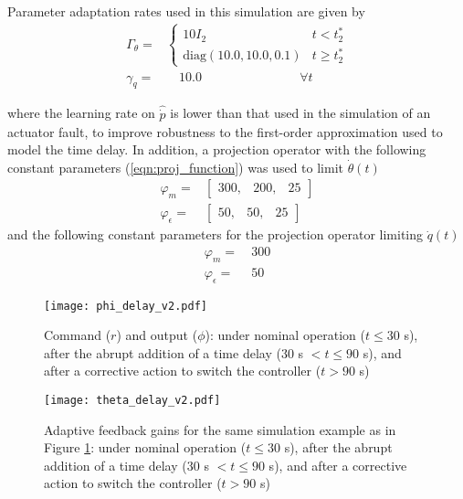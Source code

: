 \noindent Parameter adaptation rates used in this simulation are given by
\begin{align}
	\Gamma_\theta  = & \begin{cases}
		10 I_2 & t < t_2^*\\
		\text{diag}(10.0, 10.0, 0.1) & t \geq t_2^*
 	\end{cases} \\
	\gamma_q  = &\quad 10.0 \qquad ~ \qquad ~ \qquad ~ \quad \forall t
\end{align}

\noindent where the learning rate on $\hat{\dot{p}}$ is lower than that used in the simulation of an actuator fault, to improve robustness to the first-order approximation used to model the time delay. In addition, a projection operator with the following constant parameters (\ref{eqn:proj_function}) was used to limit $\dot{\theta}(t)$
\begin{align}
	\varphi_m = & \begin{bmatrix}
		300, & 200, & 25
	\end{bmatrix} \\
	\varphi_{\epsilon} = & \begin{bmatrix}
		50, & 50, & 25
	\end{bmatrix}\end{align}
\noindent and the following constant parameters for the projection operator limiting $\dot{q}(t)$
\begin{align}
	\varphi_m = &~ 300\\
	\varphi_{\epsilon} = &~ 50
\end{align}

\begin{figure}[h!]
	\centering
	\texttt{[image: phi\_delay\_v2.pdf]}
	\caption{Command ($r$) and output ($\phi$): under nominal operation ($t \leq 30$ s), after the abrupt addition of a time delay ($30$ s $< t \leq 90$ s), and after a corrective action to switch the controller ($t > 90$ s)}
	\label{fig:command_and_output_d}
\end{figure}

\begin{figure}[h!]
	\centering
	\texttt{[image: theta\_delay\_v2.pdf]}
	\caption{Adaptive feedback gains for the same simulation example as in Figure \ref{fig:command_and_output_d}: under nominal operation ($t \leq 30$ s), after the abrupt addition of a time delay ($30$ s $< t \leq 90$ s), and after a corrective action to switch the controller ($t > 90$ s)}
	\label{fig:theta_d}
\end{figure}

